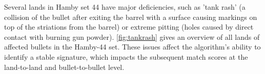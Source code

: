 \documentclass[doubleblind]{elsarticle}\usepackage[]{graphicx}\usepackage[]{color}
\newenvironment{knitrout}{}{} %
\begin{document}
Several lands in Hamby set 44 have major deficiencies,  such as 'tank rash' (a collision of the bullet after exiting the barrel with a surface causing markings on top of the striations from the barrel) or extreme pitting (holes caused by direct contact with burning gun powder).
\autoref{fig:tankrash} gives an overview of all lands of affected bullets in the Hamby-44 set. These issues affect the algorithm's ability to identify a stable signature, which impacts the subsequent match scores  at the land-to-land and bullet-to-bullet level.
\begin{knitrout}
\color{fgcolor}\begin{figure}
\newline
{}
\newline
{}
\newline

\end{figure}
\end{knitrout}
\end{document}
